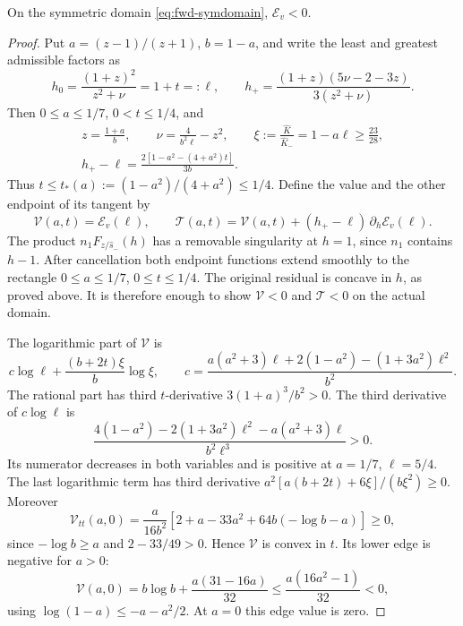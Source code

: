 \begin{lemma}\label{lem:fwd-individual}
On the symmetric domain \eqref{eq:fwd-symdomain}, $\mathcal E_v<0$.
\end{lemma}

\begin{proof}
Put $a=(z-1)/(z+1)$, $b=1-a$, and write the least and greatest admissible factors as
\[
 h_0=\frac{(1+z)^2}{z^2+\nu}=1+t=:\ell,\qquad
 h_+=\frac{(1+z)(5\nu-2-3z)}{3(z^2+\nu)}.
\]
Then $0\le a\le1/7$, $0<t\le1/4$, and
\begin{gather*}
 z=\frac{1+a}{b},\qquad
 \nu=\frac4{b^2\ell}-z^2,\qquad
 \xi:=\frac{\hat K}{\hat K_-}=1-a\ell\ge\frac{23}{28},\\
 h_+-\ell=\frac{2[1-a^2-(4+a^2)t]}{3b}.
\end{gather*}
Thus $t\le t_*(a):=(1-a^2)/(4+a^2)\le1/4$.
Define the value and the other endpoint of its tangent by
\[
 \mathcal V(a,t)=\mathcal E_v(\ell),\qquad
 \mathcal T(a,t)=\mathcal V(a,t)
       +(h_+-\ell)\,\partial_h\mathcal E_v(\ell).
\]
The product $n_1F_{z/\hat s_-}(h)$ has a removable singularity at $h=1$, since $n_1$ contains
$h-1$. After cancellation both endpoint functions extend smoothly to the rectangle
$0\le a\le1/7$, $0\le t\le1/4$.
The original residual is concave in $h$, as proved above. It is therefore enough to show
$\mathcal V<0$ and $\mathcal T<0$ on the actual domain.

 The logarithmic part of $\mathcal V$ is
\[
 c\log\ell+\frac{(b+2t)\xi}{b}\log\xi,\qquad
 c=\frac{a(a^2+3)\ell+2(1-a^2)-(1+3a^2)\ell^2}{b^2}.
\]
The rational part has third $t$-derivative $3(1+a)^3/b^2>0$.
The third derivative of $c\log\ell$ is
\[
 \frac{4(1-a^2)-2(1+3a^2)\ell^2-a(a^2+3)\ell}{b^2\ell^3}>0.
\]
Its numerator decreases in both variables and is positive at $a=1/7$, $\ell=5/4$.
The last logarithmic term has third derivative
$a^2[a(b+2t)+6\xi]/(b\xi^2)\ge0$.
Moreover
\[
 \mathcal V_{tt}(a,0)
 =\frac{a}{16b^2}\left[2+a-33a^2+64b(-\log b-a)\right]\ge0,
\]
since $-\log b\ge a$ and $2-33/49>0$. Hence $\mathcal V$ is convex in $t$.
Its lower edge is negative for $a>0$:
\[
 \mathcal V(a,0)=b\log b+\frac{a(31-16a)}{32}
 \le\frac{a(16a^2-1)}{32}<0,
\]
using $\log(1-a)\le-a-a^2/2$. At $a=0$ this edge value is zero.


\end{proof}
